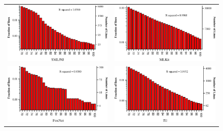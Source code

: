 \documentclass[12pt,abstracton]{scrartcl}
\begin{document}
\begin{figure}[h!]
\centering
\begin{tabular}{cc}
\includegraphics[scale=0.68]{log-smlnj.eps} & \includegraphics[scale=0.68]{log-mlkit.eps} \\
\includegraphics[scale=0.68]{log-foxnet.eps} & \includegraphics[scale=0.68]{log-til.eps} \\

\end{tabular}
\end{figure}
\end{document}
